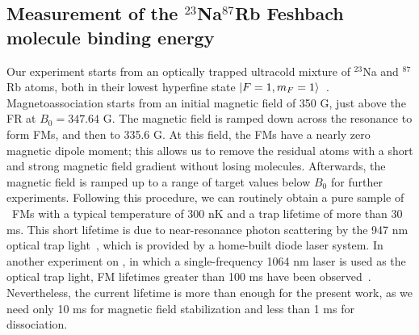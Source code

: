 \subsection{Measurement of the $^{23}$Na$^{87}$Rb Feshbach molecule binding energy}

Our experiment starts from an optically trapped ultracold mixture of $^{23}$Na and $^{87}$Rb atoms, both in their lowest hyperfine state $\ket{F = 1, m_F = 1}$~\cite{wang2013observation,wang2015formation,jia2020}. Magnetoassociation starts from an initial magnetic field of 350 G, just above the FR at $B_0 = 347.64$ G. The magnetic field is ramped down across the resonance to form FMs, and then to 335.6 G. At this field, the FMs have a nearly zero magnetic dipole moment; this allows us to remove the residual atoms with a short and strong magnetic field gradient without losing molecules. Afterwards, the magnetic field is ramped up to a range of target values below $B_0$ for further experiments. Following this procedure, we can routinely obtain a pure sample of \NaRb~FMs with a typical temperature of 300 nK and a trap lifetime of more than 30 ms. This short lifetime is due to near-resonance photon scattering by the 947 nm optical trap light~\cite{Guo2017,jia2020}, which is provided by a home-built diode laser system. In another experiment on \NaRb, in which a single-frequency 1064 nm laser is used as the optical trap light, FM lifetimes greater than 100 ms have been observed~\cite{Wang2019,guo2021leehuangyang}. Nevertheless, the current lifetime is more than enough for the present work, as we need only 10 ms for magnetic field stabilization and less than 1 ms for dissociation.

